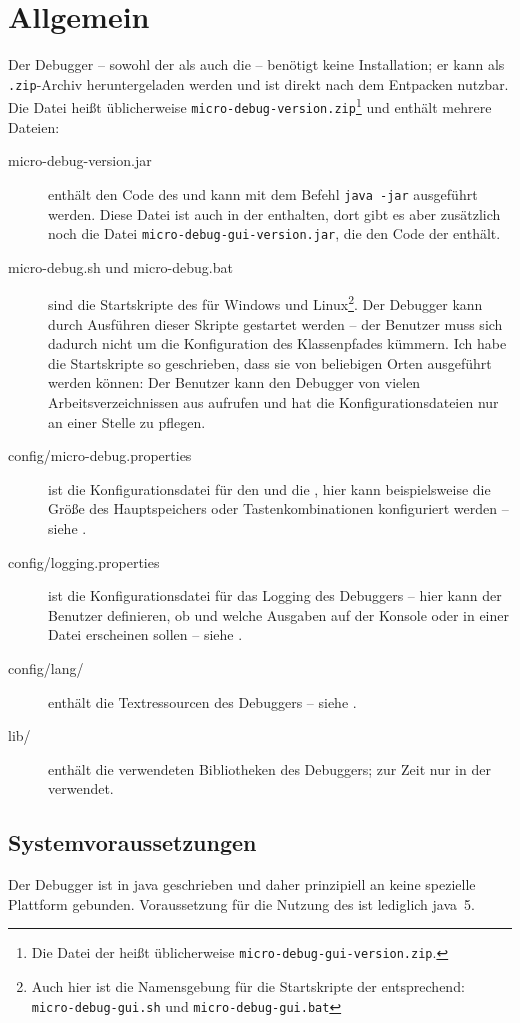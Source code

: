 \chapter{Allgemein}
Der Debugger -- sowohl der \md als auch die \mdg{} -- benötigt keine Installation; er kann als \texttt{.zip}-Archiv heruntergeladen werden und ist direkt nach dem Entpacken nutzbar. Die Datei heißt üblicherweise \texttt{micro-debug-version.zip}\footnote{Die Datei der \mdg heißt üblicherweise \texttt{micro-debug-gui-version.zip}.} und enthält mehrere Dateien:

\begin{description}
\item[micro-debug-version.jar] enthält den Code des \md und kann mit dem Befehl \texttt{java~-jar} ausgeführt werden. Diese Datei ist auch in der \mdg enthalten, dort gibt es aber zusätzlich noch die Datei \texttt{micro-debug-gui-version.jar}, die den Code der \mdg enthält.
\item[micro-debug.sh und micro-debug.bat] sind die Startskripte des \md für Windows und Linux\footnote{Auch hier ist die Namensgebung für die Startskripte der \mdg entsprechend: \texttt{micro-debug-gui.sh} und \texttt{micro-debug-gui.bat}}. Der Debugger kann durch Ausführen dieser Skripte gestartet werden -- der Benutzer muss sich dadurch nicht um die Konfiguration des Klassenpfades kümmern. Ich habe die Startskripte so geschrieben, dass sie von beliebigen Orten ausgeführt werden können: Der Benutzer kann den Debugger von vielen Arbeitsverzeichnissen aus aufrufen und hat die Konfigurationsdateien nur an einer Stelle zu pflegen.
\item[config/micro-debug.properties] ist die Konfigurationsdatei für den \md und die \mdg, hier kann beispielsweise die Größe des Hauptspeichers oder Tastenkombinationen konfiguriert werden -- siehe .
\item[config/logging.properties] ist die Konfigurationsdatei für das Logging des Debuggers -- hier kann der Benutzer definieren, ob und welche Ausgaben auf der Konsole oder in einer Datei erscheinen sollen -- siehe .
\item[config/lang/] enthält die Textressourcen des Debuggers -- siehe .
\item[lib/] enthält die verwendeten Bibliotheken des Debuggers; zur Zeit nur in der \mdg verwendet.
\end{description}

\section{Systemvoraussetzungen}
Der Debugger ist in \gls{java} geschrieben und daher prinzipiell an keine spezielle Plattform gebunden. Voraussetzung für die Nutzung des \md ist lediglich \gls{java}~5.

